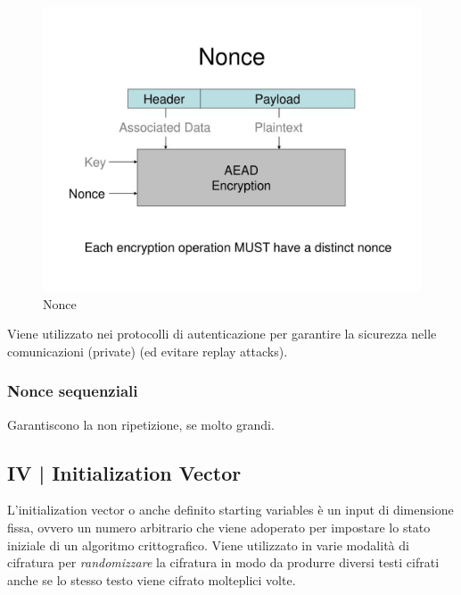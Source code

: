 \begin{figure}[H]
	\centering
	\includegraphics[width=.9\textwidth, height=.9\textheight, keepaspectratio]{./images/iv_nonce_salt_pepper/nonce.png}
	\caption{Nonce}
	\label{fig:nonce}
\end{figure}

\textsf{\small Viene utilizzato nei protocolli di autenticazione per garantire la sicurezza nelle comunicazioni (private) (ed evitare replay attacks).} %

\subsubsection{Nonce sequenziali}

 

\textsf{\small Garantiscono la non ripetizione, se molto grandi.} %


\subsection{IV | Initialization Vector}



\textsf{\small L'initialization vector o anche definito starting variables è un input di dimensione fissa, ovvero un numero arbitrario che viene adoperato per impostare lo stato iniziale di un algoritmo crittografico. Viene utilizzato in varie modalità di cifratura per \emph{randomizzare} la cifratura in modo da produrre diversi testi cifrati anche se lo stesso testo viene cifrato molteplici volte.} %

